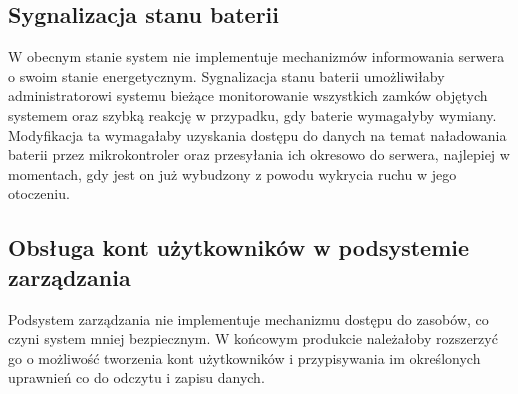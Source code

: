         \subsection{Sygnalizacja stanu baterii}

            W obecnym stanie system nie implementuje mechanizmów informowania serwera o swoim stanie energetycznym.
            Sygnalizacja stanu baterii umożliwiłaby administratorowi systemu bieżące monitorowanie wszystkich zamków objętych systemem oraz szybką reakcję w przypadku, gdy baterie wymagałyby wymiany. Modyfikacja ta wymagałaby uzyskania dostępu do danych na temat naładowania baterii przez mikrokontroler oraz przesyłania ich okresowo do serwera, najlepiej w momentach, gdy jest on już wybudzony z powodu wykrycia ruchu w jego otoczeniu.

        \subsection{Obsługa kont użytkowników w podsystemie zarządzania}
            Podsystem zarządzania nie implementuje mechanizmu dostępu do zasobów, co czyni system mniej bezpiecznym. W końcowym produkcie należałoby rozszerzyć go o możliwość tworzenia kont użytkowników i przypisywania im określonych uprawnień co do odczytu i zapisu danych.
